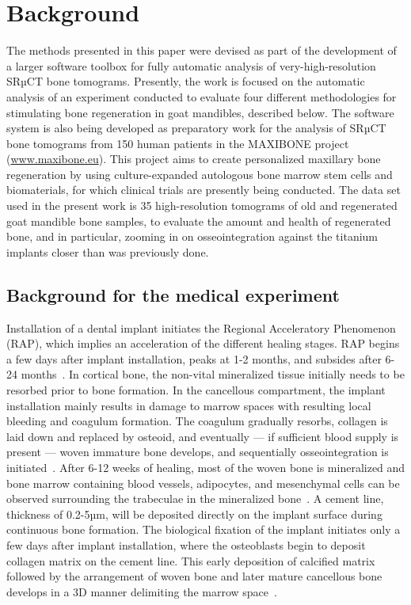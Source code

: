 \section{Background}
\label{sec:background}

The methods presented in this paper were devised as part of the development of
a larger software toolbox for fully automatic analysis of very-high-resolution
SRµCT bone tomograms. Presently, the work is focused on the automatic analysis
of an experiment conducted to evaluate four different methodologies for
stimulating bone regeneration in goat mandibles, described below. The software
system is also being developed as preparatory work for the analysis of SRµCT
bone tomograms from 150 human patients in the MAXIBONE project
(\url{www.maxibone.eu}). This project aims to create personalized maxillary
bone regeneration by using culture-expanded autologous bone marrow stem cells
and biomaterials, for which clinical trials are presently being conducted. The
data set used in the present work is 35 high-resolution tomograms of old and
regenerated goat mandible bone samples, to evaluate the amount and health of
regenerated bone, and in particular, zooming in on osseointegration against the
titanium implants closer than was previously done.

\subsection{Background for the medical experiment} Installation of a dental
implant initiates the Regional Acceleratory Phenomenon (RAP), which implies an
acceleration of the different healing stages. RAP begins a few days after
implant installation, peaks at 1-2 months, and subsides after 6-24
months~\cite{frost1989}. In cortical bone, the non-vital mineralized tissue
initially needs to be resorbed prior to bone formation. In the cancellous
compartment, the implant installation mainly results in damage to marrow spaces
with resulting local bleeding and coagulum formation. The coagulum gradually
resorbs, collagen is laid down and replaced by osteoid, and eventually --- if
sufficient blood supply is present --- woven immature bone develops, and
sequentially osseointegration is initiated~\cite{frost1989}. After 6-12 weeks
of healing, most of the woven bone is mineralized and bone marrow containing
blood vessels, adipocytes, and mesenchymal cells can be observed surrounding
the trabeculae in the mineralized bone~\cite{Berglundh2003, Abrahamsson2004}. A
cement line, thickness of 0.2-5µm, will be deposited directly on the implant
surface during continuous bone formation. The biological fixation of the
implant initiates only a few days after implant installation, where the
osteoblasts begin to deposit collagen matrix on the cement line. This early
deposition of calcified matrix followed by the arrangement of woven bone and
later mature cancellous bone develops in a 3D manner delimiting the marrow
space~\cite{Franchi2004}.

